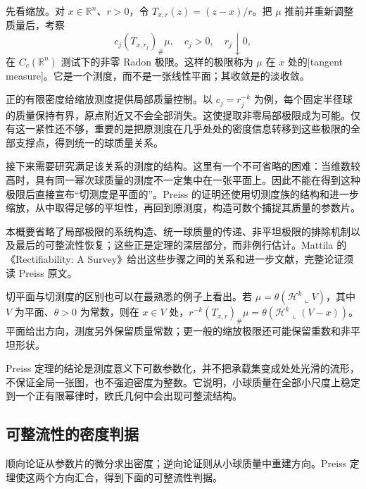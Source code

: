 \begin{proofsketch}
先看缩放。对 \(x\in\mathbb R^n\)、\(r>0\)，令 \(T_{x,r}(z)=(z-x)/r\)。把 \(\mu\) 推前并重新调整质量后，考察
\[
 c_j(T_{x,r_j})_\#\mu,
 \quad c_j>0,\quad r_j\downarrow0,
\]
在 \(C_c(\mathbb R^n)\) 测试下的非零 Radon 极限。这样的极限称为 \(\mu\) 在 \(x\) 处的[tangent measure]。它是一个测度，而不是一张线性平面；其收敛是的淡收敛。

正的有限密度给缩放测度提供局部质量控制。以 \(c_j=r_j^{-k}\) 为例，每个固定半径球的质量保持有界，原点附近又不会全部消失。这使提取非零局部极限成为可能。仅有这一紧性还不够，重要的是把原测度在几乎处处的密度信息转移到这些极限的全部支撑点，得到统一的球质量关系。

接下来需要研究满足该关系的测度的结构。这里有一个不可省略的困难：当维数较高时，具有同一幂次球质量的测度不一定集中在一张平面上。因此不能在得到这种极限后直接宣布“切测度是平面的”。Preiss 的证明还使用切测度族的结构和进一步缩放，从中取得足够的平坦性，再回到原测度，构造可数个捕捉其质量的参数片。

本概要省略了局部极限的系统构造、统一球质量的传递、非平坦极限的排除机制以及最后的可整流性恢复；这些正是定理的深层部分，而非例行估计。Mattila 的《Rectifiability: A Survey》\cite[Sections 4.3 Tangent Measures and 4.4 Densities]{Mattila2023Rectifiability}给出这些步骤之间的关系和进一步文献，完整论证须读 Preiss 原文。
\end{proofsketch}

切平面与切测度的区别也可以在最熟悉的例子上看出。若 \(\mu=\theta(\mathcal H^k\llcorner V)\)，其中 \(V\) 为平面、\(\theta>0\) 为常数，则在 \(x\in V\) 处，\(r^{-k}(T_{x,r})_\#\mu=\theta(\mathcal H^k\llcorner(V-x))\)。平面给出方向，测度另外保留质量常数；更一般的缩放极限还可能保留重数和非平坦形状。

\ProseParagraphBreak

Preiss 定理的结论是测度意义下可数参数化，并不把承载集变成处处光滑的流形，不保证全局一张图，也不强迫密度为整数。它说明，小球质量在全部小尺度上稳定到一个正有限幂律时，欧氏几何中会出现可整流结构。

\subsection{可整流性的密度判据}
\label{b1:subsec:190402}

顺向论证从参数片的微分求出密度；逆向论证则从小球质量中重建方向。Preiss 定理使这两个方向汇合，得到下面的可整流性判据。

